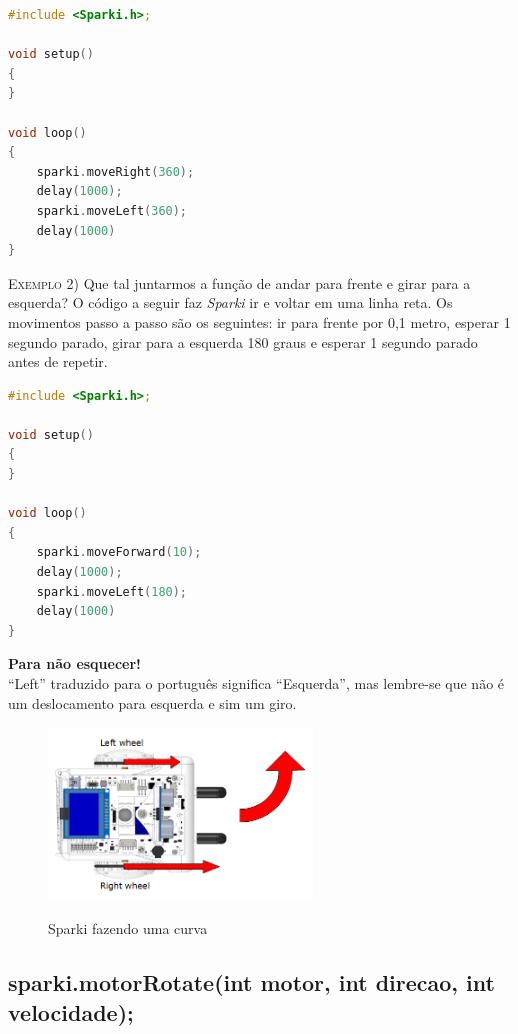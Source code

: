     \begin{lstlisting}[language=C]
#include <Sparki.h>;

void setup()
{
}

void loop()
{
    sparki.moveRight(360);
    delay(1000);
    sparki.moveLeft(360);
    delay(1000)
}
\end{lstlisting}

    \textsc{Exemplo 2)} Que tal juntarmos a função de andar para frente e girar para a esquerda? O código a seguir faz \textsl{Sparki} ir e voltar em uma linha reta. Os movimentos passo a passo são os seguintes: ir para frente por 0,1 metro, esperar 1 segundo parado, girar para a esquerda 180 graus e esperar 1 segundo parado antes de repetir.

\begin{lstlisting}[language=C]
#include <Sparki.h>;

void setup()
{
}

void loop()
{
    sparki.moveForward(10);
    delay(1000);
    sparki.moveLeft(180);
    delay(1000)
}
\end{lstlisting}
    
    \begin{center}
   \textcolor{mydarkblue}{\textbf{Para não esquecer!}}
   \\``Left'' traduzido para o português significa ``Esquerda'', mas lembre-se que não é um deslocamento para esquerda e sim um giro.
    \end{center}
    
    \begin{figure}[h]
    \caption{Sparki fazendo uma curva}
     
    \centering 
    \includegraphics[width=7cm]{Figuras/movingTheRobotmoveLeft.png}
    \label{figura:movingTheRobotmoveLeft.png}
    \end{figure}
    
\subsection{sparki.motorRotate(int motor, int direcao,  int velocidade);}

